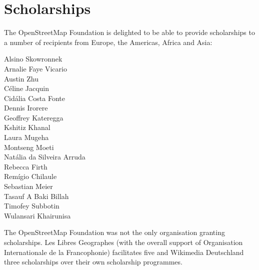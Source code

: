 \newpage
\section*{Scholarships}
\label{scholarships}
\pagestyle{cropmarksstyle}

The OpenStreetMap Foundation is delighted to be able to provide scholarships to a number of
recipients from Europe, the Americas, Africa and Asia:

\RaggedRight
\begin{multicols}{2}
  Alsino Skowronnek\\
  Arnalie Faye Vicario\\
  Austin Zhu\\
  Céline Jacquin\\
  Cidália Costa Fonte\\
  Dennis Irorere\\
  Geoffrey Kateregga\\
  Kshitiz Khanal\\
  Laura Mugeha\\
  Montseng Moeti\\
  Natália da Silveira Arruda\\
  Rebecca Firth\\
  Remígio Chilaule\\
  Sebastian Meier\\
  Tasauf A Baki Billah\\
  Timofey Subbotin\\
  Wulansari Khairunisa\\
\end{multicols}
\justifying

The OpenStreetMap Foundation was not the only organisation granting scholarships. Les Libres
Geographes (with the overall support of Organisation Internationale de la Francophonie) facilitates five and Wikimedia Deutschland three scholarships over their own scholarship programmes.
